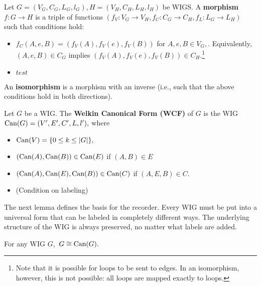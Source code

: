\begin{definition}
  Let $G = (V_{G}, C_{G}, L_{G}, l_{G}), H = (V_{H}, C_{H}, L_{H}, l_{H})$ be WIGS. A \textbf{morphism} $f: G \to H$ is a triple of functions $(f_{V}: V_{G} \to V_{H}, f_{C}: C_{G} \to C_{H}, f_{L}: L_{G} \to L_{H})$ such that conditions hold:
  \begin{itemize}
    \item   $f_{C}(A, e, B) = (f_{V}(A), f_{V}(e), f_{V}(B))$ for $A, e, B \in V_{G},$. Equivalently, $(A, e, B) \in C_{G}$ implies $(f_{V}(A), f_{V}(e), f_{V}(B)) \in C_{H}.$\footnote{Note that it is possible for loops to be sent to edges. In an isomorphism, however, this is not possible: all loops are mapped exactly to loops.}
    \item $test$
  \end{itemize}
  An \textbf{isomorphism} is a morphism with an inverse (i.e., such that the above conditions hold in both directions).

\end{definition}



\begin{definition}
  Let $G$ be a WIG. The \textbf{Welkin Canonical Form (WCF)} of $G$ is the WIG $\textrm{Can}(G) = (V', E', C', L, l'),$
  where
  \begin{itemize}
    \item $\textrm{Can}(V) = \{0 \leq k \leq |G|\},$
    \item $(\textrm{Can}(A), \textrm{Can}(B)) \in \textrm{Can}(E)$ if $(A, B) \in E$
    \item $(\textrm{Can}(A), \textrm{Can}(E), \textrm{Can}(B)) \in \textrm{Can}(C)$ if $(A, E, B) \in C.$
    \item (Condition on labeling)
  \end{itemize}


\end{definition}

The next lemma defines the basis for the recorder. Every WIG must be put into a universal form that can be labeled in completely different ways. The underlying structure of the WIG is always preserved, no matter what labels are added.
\begin{lemma} For any WIG $G,$ $G \cong \textrm{Can}(G).$
\end{lemma}

